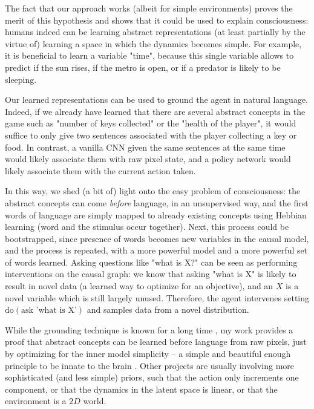 \documentclass[a4paper,11pt,oneside]{report}
\begin{document}
The fact that our approach works (albeit for simple environments) proves the merit of this hypothesis and shows that it could be used to explain consciousness: humans indeed can be learning abstract representations (at least partially by the virtue of) learning a space in which the dynamics becomes simple. For example, it is beneficial to learn a variable "time", because this single variable allows to predict if the sun rises, if the metro is open, or if a predator is likely to be sleeping.

Our learned representations can be used to ground the agent in natural language. Indeed, if we already have learned that there are several abstract concepts in the game such as "number of keys collected" or the "health of the player", it would suffice to only give two sentences associated with the player collecting a key or food. In contrast, a vanilla CNN given the same sentences at the same time would likely associate them with raw pixel state, and a policy network would likely associate them with the current action taken.

In this way, we shed (a bit of) light onto the easy problem of consciousness: the abstract concepts can come {\em before} language, in an unsupervised way, and the first words of language are simply mapped to already existing concepts using Hebbian learning (word and the stimulus occur together). Next, this process could be bootstrapped, since presence of words becomes new variables in the causal model, and the process is repeated, with a more powerful model and a more powerful set of words learned. Asking questions like "what is X?" can be seen as performing interventions on the causal graph: we know that asking "what is X" is likely to result in novel data (a learned way to optimize for an objective), and an $X$ is a novel variable which is still largely unused. Therefore, the agent intervenes setting $\mbox{do}(\mbox{ask 'what is X'})$ and samples data from a novel distribution.

While the grounding technique is known for a long time \cite{Hofstadter1994}, my work provides a proof that abstract concepts can be learned before language from raw pixels, just by optimizing for the inner model simplicity -- a simple and beautiful enough principle to be innate to the brain \cite{Babadi2014}. Other projects are usually involving more sophisticated (and less simple) priors, such that the action only increments one component, or that the dynamics in the latent space is linear, or that the environment is a $2D$ world.
\end{document}
